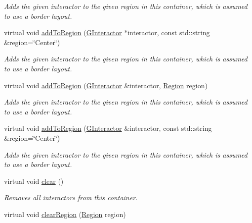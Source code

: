 \begin{DoxyCompactItemize}
\begin{DoxyCompactList}\small\item\em Adds the given interactor to the given region in this container, which is assumed to use a border layout. \end{DoxyCompactList}\item 
virtual void \mbox{\hyperlink{classsgl_1_1GContainer_a9c8e600889001e6e72d3548918a6baff}{add\+To\+Region}} (\mbox{\hyperlink{classsgl_1_1GInteractor}{G\+Interactor}} $\ast$interactor, const std\+::string \&region=\char`\"{}Center\char`\"{})
\begin{DoxyCompactList}\small\item\em Adds the given interactor to the given region in this container, which is assumed to use a border layout. \end{DoxyCompactList}\item 
virtual void \mbox{\hyperlink{classsgl_1_1GContainer_ad05df0d92ab2fba95d401a5614365558}{add\+To\+Region}} (\mbox{\hyperlink{classsgl_1_1GInteractor}{G\+Interactor}} \&interactor, \mbox{\hyperlink{classsgl_1_1GContainer_a81a01a86de31071a92e6cce0bab9bc4b}{Region}} region)
\begin{DoxyCompactList}\small\item\em Adds the given interactor to the given region in this container, which is assumed to use a border layout. \end{DoxyCompactList}\item 
virtual void \mbox{\hyperlink{classsgl_1_1GContainer_a667ed0065e0bbb52a893904e7f2383bb}{add\+To\+Region}} (\mbox{\hyperlink{classsgl_1_1GInteractor}{G\+Interactor}} \&interactor, const std\+::string \&region=\char`\"{}Center\char`\"{})
\begin{DoxyCompactList}\small\item\em Adds the given interactor to the given region in this container, which is assumed to use a border layout. \end{DoxyCompactList}\item 
virtual void \mbox{\hyperlink{classsgl_1_1GContainer_ac8bb3912a3ce86b15842e79d0b421204}{clear}} ()
\begin{DoxyCompactList}\small\item\em Removes all interactors from this container. \end{DoxyCompactList}\item 
virtual void \mbox{\hyperlink{classsgl_1_1GContainer_a47f0cc45498a78757fa4d0e6befc2981}{clear\+Region}} (\mbox{\hyperlink{classsgl_1_1GContainer_a81a01a86de31071a92e6cce0bab9bc4b}{Region}} region)

\end{DoxyCompactItemize}
